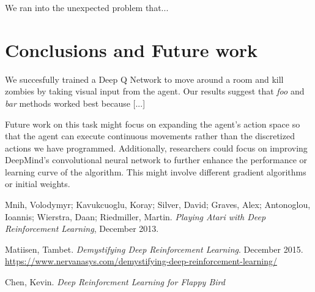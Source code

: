 \documentclass{article}
\begin{document}
\begin{multicols}{2}
We ran into the unexpected problem that...





\section{Conclusions and Future work}
We succesfully trained a Deep Q Network to move around a room and kill zombies by taking visual input from the agent.
Our results suggest that \emph{foo} and \emph{bar} methods worked best because [...]

Future work on this task might focus on expanding the agent's action space so that the agent can execute continuous movements rather than the discretized actions we have programmed.
Additionally, researchers could focus on improving DeepMind's convolutional neural network to further enhance the performance or learning curve of the algorithm.
This might involve different gradient algorithms or initial weights.

\end{multicols}





\pagebreak
\begin{thebibliography}{9}


Mnih, Volodymyr; Kavukcuoglu, Koray; Silver, David; Graves, Alex; Antonoglou, Ioannis; Wierstra, Daan; Riedmiller, Martin.
\emph{Playing Atari with Deep Reinforcement Learning},
December 2013.

Matiisen, Tambet.
\emph{Demystifying Deep Reinforcement Learning}. December 2015.
\url{https://www.nervanasys.com/demystifying-deep-reinforcement-learning/}

Chen, Kevin.
\emph{Deep Reinforcment Learning for Flappy Bird}


\end{thebibliography}
\end{document}
